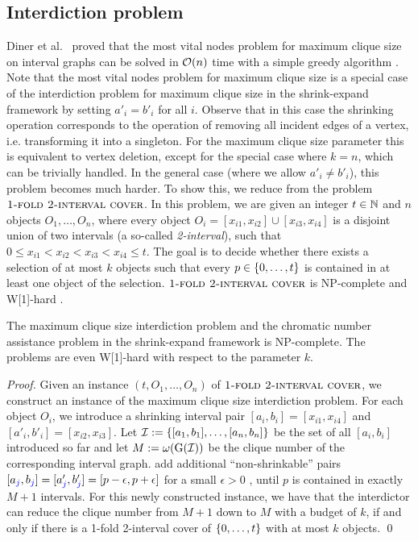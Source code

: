 \subsection{Interdiction problem}

Diner et al.\ \cite{diner2018contractionDeletionBlockers} proved that the most vital nodes problem for maximum clique size on interval graphs can be solved in $\mathcal{O}(n)$ time with a simple greedy algorithm \cite{diner2018contractionDeletionBlockers}. 
Note that the most vital nodes problem for maximum clique size is a special case of the interdiction problem for maximum clique size in the shrink-expand framework 
by setting $a'_i = b'_i$ for all $i$. Observe that in this case the shrinking operation corresponds 
to the operation of removing all incident edges of a vertex, i.e. transforming it into a singleton. For 
the maximum clique size parameter this is equivalent to vertex deletion, except for the special case where $k=n$, which can be trivially handled.
In the general case (where we allow $a'_i \neq b'_i$), this problem becomes much harder. To show this, we reduce from the problem $\textsc{1-fold 2-interval cover}$. In this problem, we are given an integer $t \in \mathbb{N}$ and $n$ objects $O_1,\dots,O_n$, where every object $O_i = [x_{i1},x_{i2}] \cup [x_{i3}, x_{i4}]$ is a disjoint union of two intervals (a so-called \emph{2-interval}), such that $0 \leq x_{i1} < x_{i2} < x_{i3} < x_{i4} \leq t$. The goal is to decide whether there exists a selection of at most $k$ objects such that every $p \in \{ 0, \ldots, t \}$ is contained in at least one object of the selection. $\textsc{1-fold 2-interval cover}$ is NP-complete \cite{ding2011onefold} and W[1]-hard \cite{approximability-c-interval}.

\begin{theorem}
The maximum clique size interdiction problem and the chromatic number assistance problem in the shrink-expand framework is NP-complete. The problems are even W[1]-hard with respect to the parameter $k$.
\end{theorem}
\begin{proof}
Given an instance $(t, O_1, \dots, O_n)$ of $\textsc{1-fold 2-interval cover}$, we construct an instance of the maximum clique size interdiction problem. For each object $O_i$, we introduce a shrinking interval pair $[a_i, b_i] = [x_{i1}, x_{i4}]$ and $[a'_i, b'_i] = [x_{i2},x_{i3}]$. Let $\mathcal{I} := \{ [a_1, b_1], \ldots, [a_n, b_n] \}$ be the set of all $[a_i, b_i]$ introduced so far and let $M := \omega(\operatorname{G}(\mathcal{I}))$ be the clique number of the corresponding interval graph.  add additional \enquote{non-shrinkable} pairs $[a_{\textcolor{blue}{j}}, b_{\textcolor{blue}{j}}] = [a'_{\textcolor{blue}{j}}, b'_{\textcolor{blue}{j}}] = [p- \epsilon, p + \epsilon]$ for a small $\epsilon > 0$ , until $p$ is contained in exactly $M + 1$ intervals. For this newly constructed instance, we have that the interdictor can reduce the clique number from $M + 1$ down to $M$ with a budget of $k$, if and only if there is a 1-fold 2-interval cover of $\{ 0, \ldots, t \}$ with at most $k$ objects.
\qed\end{proof}

